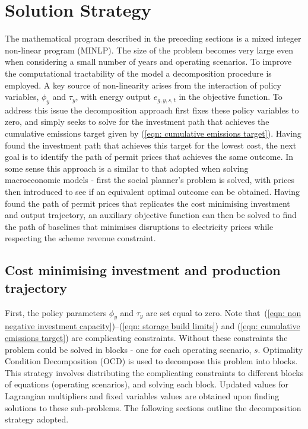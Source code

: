 \documentclass{article}
\newcommand{\iGenerator}{g}
\newcommand{\iYear}{y}
\newcommand{\iScenario}{s}
\newcommand{\iInterval}{t}
\newcommand{\vBaseline}[1][\iYear]{\phi_{#1}}
\newcommand{\vPermitPrice}[1][\iYear]{\tau_{#1}}
\newcommand{\vEnergy}[1][\iGenerator,\iYear,\iScenario,\iInterval]{e_{#1}}
\begin{document}
\section{Solution Strategy}
The mathematical program described in the preceding sections is a mixed integer non-linear program (MINLP). The size of the problem becomes very large even when considering a small number of years and operating scenarios. To improve the computational tractability of the model a decomposition procedure is employed. A key source of non-linearity arises from the interaction of policy variables, $\vBaseline$ and $\vPermitPrice$, with energy output $\vEnergy$ in the objective function. To address this issue the decomposition approach first fixes these policy variables to zero, and simply seeks to solve for the investment path that achieves the cumulative emissions target given by (\ref{eqn: cumulative emissions target}). Having found the investment path that achieves this target for the lowest cost, the next goal is to identify the path of permit prices that achieves the same outcome. In some sense this approach is a similar to that adopted when solving macroeconomic models - first the social planner's problem is solved, with prices then introduced to see if an equivalent optimal outcome can be obtained. Having found the path of permit prices that replicates the cost minimising investment and output trajectory, an auxiliary objective function can then be solved to find the path of baselines that minimises disruptions to electricity prices while respecting the scheme revenue constraint.

\subsection{Cost minimising investment and production trajectory}
First, the policy parameters $\vBaseline$ and $\vPermitPrice$ are set equal to zero. Note that~(\ref{eqn: non negative investment capacity})--(\ref{eqn: storage build limits}) and (\ref{eqn: cumulative emissions target}) are complicating constraints. Without these constraints the problem could be solved in blocks - one for each operating scenario, $\iScenario$. Optimality Condition Decomposition (OCD) is used to decompose this problem into blocks. This strategy involves distributing the complicating constraints to different blocks of equations (operating scenarios), and solving each block. Updated values for Lagrangian multipliers and fixed variables values are obtained upon finding solutions to these sub-problems. The following sections outline the decomposition strategy adopted.
\end{document}

